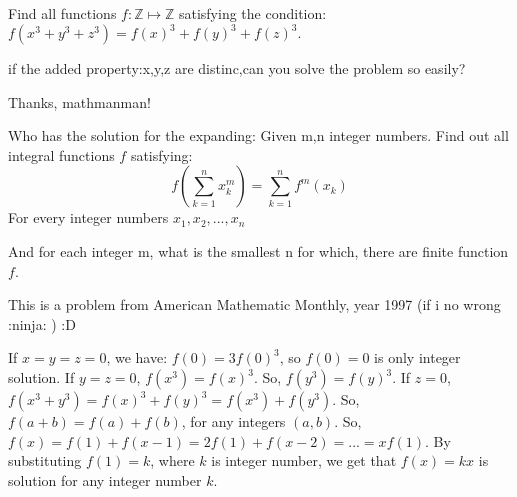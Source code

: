 \begin{solution}
	\begin{tcolorbox}Find all functions $f: \mathbb{Z} \mapsto \mathbb{Z}$ satisfying the condition: $f(x^3 +y^3 +z^3 )=f(x)^3+f(y)^3+f(z)^3.$\end{tcolorbox}if the added property:x,y,z are distinc,can you solve the problem so easily?
\end{solution}



\begin{solution}
	Thanks, mathmanman!
\end{solution}



\begin{solution}
	Who has the solution for the expanding: Given m,n integer numbers. Find out all integral functions $f$ satisfying:
\[ f(\sum_{k=1}^nx_k^m)=\sum_{k=1}^nf^m(x_k)  \]
For every integer numbers $x_1,x_2,...,x_n$

And for each integer m, what is the smallest n for which, there are finite function $f$.
\end{solution}



\begin{solution}
	This is a problem from American Mathematic Monthly, year 1997 (if i no wrong  :ninja: )  :D
\end{solution}



\begin{solution}
	If $ x = y = z = 0$, we have: $ f(0) = 3f(0)^{3}$, so $ f(0) = 0$ is only integer solution.
If $ y = z = 0$, $ f(x^{3}) = f(x)^{3}$. So, $ f(y^{3}) = f(y)^{3}$.
If $ z = 0$, $ f(x^{3}+y^{3}) = f(x)^{3}+f(y)^{3}= f(x^{3})+f(y^{3})$. So, $ f(a+b) = f(a)+f(b)$, for any integers $ (a,b)$.
So, $ f(x) = f(1)+f(x-1) = 2f(1)+f(x-2) = ... = xf(1)$. By substituting $ f(1) = k$, where $ k$ is integer number, we get that $ f(x) = kx$ is solution for any integer number $ k$.
\end{solution}



